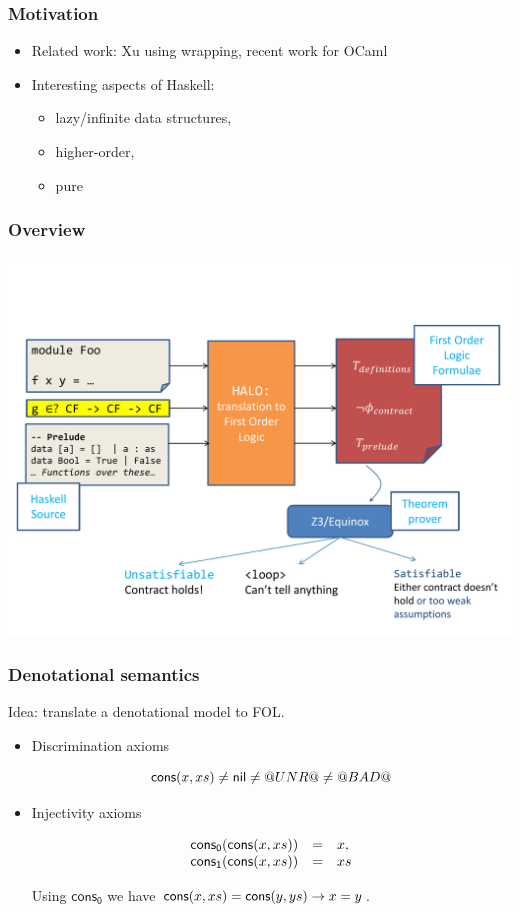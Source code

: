 \documentclass[serif,professionalfont]{beamer}
\begin{document}
\begin{frame}[fragile]
  \frametitle{Motivation}

  \begin{itemize}

    \item Related work:
      Xu using wrapping, recent work for OCaml

    \item Interesting aspects of Haskell:
      \begin{itemize}
        \item lazy/infinite data structures,
        \item higher-order,
        \item pure
      \end{itemize}
  \end{itemize}

\end{frame}

\begin{frame}[fragile]
  \frametitle{Overview}

  \includegraphics[width=\textwidth]{overview.pdf}

\end{frame}

\begin{frame}[fragile]
  \frametitle{Denotational semantics}

  Idea: translate a denotational model to FOL.

  \begin{itemize}
    \item Discrimination axioms

    $$
    \mathsf{cons}(x,xs) \neq \mathsf{nil} \neq @UNR@ \neq @BAD@
    $$

    \item Injectivity axioms

    \[\begin{array}{lcl}
      \mathsf{cons_0}(\mathsf{cons}(x,xs)) & = & x, \\
      \mathsf{cons_1}(\mathsf{cons}(x,xs)) & = & xs
    \end{array}\]

    Using $\mathsf{cons_0}$ we have $\mathsf{cons}(x,xs) = \mathsf{cons}(y,ys) \to x = y$.
  \end{itemize}

\end{frame}
\end{document}
